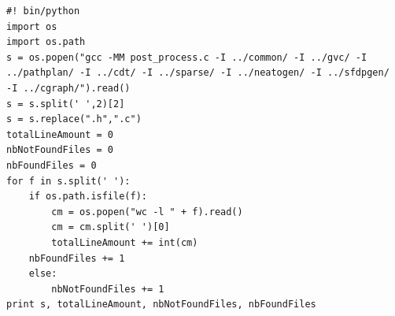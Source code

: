 \documentclass[12pt]{report}
\begin{document}
\begin{verbatim}
#! bin/python
import os
import os.path
s = os.popen("gcc -MM post_process.c -I ../common/ -I ../gvc/ -I 
../pathplan/ -I ../cdt/ -I ../sparse/ -I ../neatogen/ -I ../sfdpgen/ 
-I ../cgraph/").read()
s = s.split(' ',2)[2]
s = s.replace(".h",".c")
totalLineAmount = 0
nbNotFoundFiles = 0
nbFoundFiles = 0
for f in s.split(' '):
    if os.path.isfile(f):
        cm = os.popen("wc -l " + f).read()
        cm = cm.split(' ')[0]
        totalLineAmount += int(cm)
	nbFoundFiles += 1
    else:
        nbNotFoundFiles += 1
print s, totalLineAmount, nbNotFoundFiles, nbFoundFiles
\end{verbatim}



\end{document}
